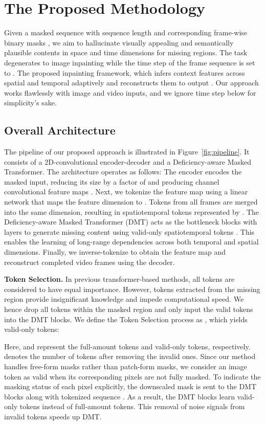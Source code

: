 \documentclass[10pt,twocolumn,letterpaper]{article}
\begin{document}
\section{The Proposed Methodology}
Given a masked sequence  with sequence length  and corresponding frame-wise binary masks , we aim to hallucinate visually appealing and semantically plausible contents in space and time dimensions for missing regions. 
The task degenerates to image inpainting while the time step of the frame sequence is set to . 
The proposed inpainting framework, which infers context features across spatial and temporal adaptively and reconstructs them to output . Our approach works flawlessly with image and video inputs, and we ignore time step  below for simplicity’s sake.



\subsection{Overall Architecture}


The pipeline of our proposed approach is illustrated in Figure~\ref{fig:pipeline}. It consists of a 2D-convolutional encoder-decoder and a Deficiency-aware Masked Transformer. The architecture operates as follows:
The encoder encodes the masked input, reducing its size by a factor of  and producing  channel convolutional feature maps .
Next, we tokenize the  feature map using a linear network that maps the feature dimension  to . Tokens from all frames are merged into the same dimension, resulting in spatiotemporal tokens represented by .
The Deficiency-aware Masked Transformer (DMT) acts as the bottleneck blocks with  layers to generate missing content using valid-only spatiotemporal tokens . This enables the learning of long-range dependencies across both temporal and spatial dimensions. Finally, we inverse-tokenize  to obtain the feature map and reconstruct completed video frames  using the decoder.

{\noindent\bf Token Selection.} In previous transformer-based methods, all tokens are considered to have equal importance. However, tokens extracted from the missing region provide insignificant knowledge and impede computational speed.
We hence drop all tokens within the masked region and only input the valid tokens  into the DMT blocks. We define the Token Selection process as , which yields valid-only tokens:

Here,  and  represent the full-amount tokens and valid-only tokens, respectively.  denotes the number of tokens after removing the invalid ones.
Since our method handles free-form masks rather than patch-form masks, we consider an image token as valid when its corresponding pixels are not fully masked. To indicate the masking status of each pixel explicitly, the downscaled mask  is sent to the DMT blocks along with tokenized sequence .
As a result, the DMT blocks learn valid-only tokens instead of full-amount tokens. This removal of noise signals from invalid tokens speeds up DMT.
\end{document}
